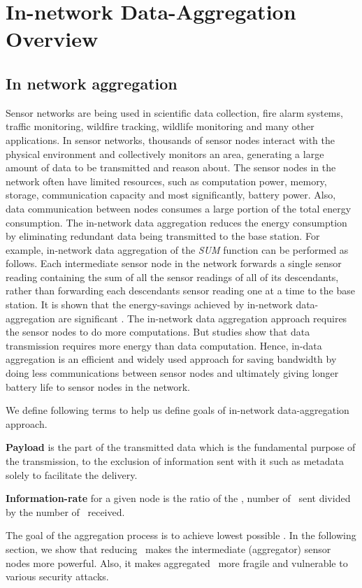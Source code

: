 \chapter{In-network Data-Aggregation Overview} %
\label{cha:In-network Data-Aggregation Overview}

\section{In network aggregation}
	Sensor networks are being used in scientific data collection, fire alarm systems, traffic monitoring, wildfire tracking, wildlife monitoring and many other applications.
	In sensor networks, thousands of sensor nodes interact with the physical environment and collectively monitors an area, generating a large amount of data to be transmitted and reason about.
	The sensor nodes in the network often have limited resources, such as computation power, memory, storage, communication capacity and most significantly, battery power.
	Also, data communication between nodes consumes a large portion of the total energy consumption. 
	The in-network data aggregation reduces the energy consumption by eliminating redundant data being transmitted to the base station.
	For example, in-network data aggregation of the \textit{SUM} function can be performed as follows. 
	Each intermediate sensor node in the network forwards a single sensor reading containing the sum of all the sensor readings of all of its descendants, rather than forwarding each descendants sensor reading one at a time to the base station.
	It is shown that the energy-savings achieved by in-network data-aggregation are significant \cite{madden2002tag}.
	The in-network data aggregation approach requires the sensor nodes to do more computations.
	But studies show that data transmission requires more energy than data computation. 
	Hence, in-data aggregation is an efficient and widely used approach for saving bandwidth by doing less communications between sensor nodes and ultimately giving longer battery life to sensor nodes in the network.

	We define following terms to help us define goals of in-network data-aggregation approach.
	\begin{definition}\label{def:payload}
		\textbf{Payload} is the part of the transmitted data which is the fundamental purpose of the transmission, to the exclusion of information sent with it such as metadata solely to facilitate the delivery.
	\end{definition}
	\begin{definition}\label{def:information-rate}
		\textbf{Information-rate} for a given node is the ratio of the \payloads, number of \payloads\ sent divided by the number of \payloads\ received.
	\end{definition}
	The goal of the aggregation process is to achieve lowest possible \informationRate.
	In the following section, we show that reducing \informationRate\ makes the intermediate (aggregator) sensor nodes more powerful. Also, it makes aggregated \payload\ more fragile and vulnerable to various security attacks.

